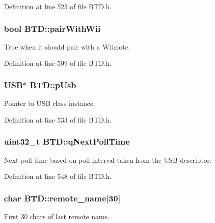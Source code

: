 \-Definition at line 525 of file \-B\-T\-D.\-h.

\hypertarget{class_b_t_d_a0c8cc2a2dd2cda3e760b8b4c1a2d169c}{
\subsubsection[{pair\-With\-Wii}]{\setlength{\rightskip}{0pt plus 5cm}bool {\bf \-B\-T\-D\-::pair\-With\-Wii}}}\label{class_b_t_d_a0c8cc2a2dd2cda3e760b8b4c1a2d169c}
\-True when it should pair with a \-Wiimote. 

\-Definition at line 509 of file \-B\-T\-D.\-h.

\hypertarget{class_b_t_d_a4bcd1d622a6455ee3d0cccc4408700a1}{
\subsubsection[{p\-Usb}]{\setlength{\rightskip}{0pt plus 5cm}\-U\-S\-B$\ast$ {\bf \-B\-T\-D\-::p\-Usb}}}\label{class_b_t_d_a4bcd1d622a6455ee3d0cccc4408700a1}
\-Pointer to \-U\-S\-B class instance. 

\-Definition at line 533 of file \-B\-T\-D.\-h.

\hypertarget{class_b_t_d_a52d6c7895f6bb01729d01ce28a2f3079}{
\subsubsection[{q\-Next\-Poll\-Time}]{\setlength{\rightskip}{0pt plus 5cm}uint32\-\_\-t {\bf \-B\-T\-D\-::q\-Next\-Poll\-Time}}}\label{class_b_t_d_a52d6c7895f6bb01729d01ce28a2f3079}
\-Next poll time based on poll interval taken from the \-U\-S\-B descriptor. 

\-Definition at line 548 of file \-B\-T\-D.\-h.

\hypertarget{class_b_t_d_aa0fd5483f227e29de23c20ee31c940aa}{
\subsubsection[{remote\-\_\-name}]{\setlength{\rightskip}{0pt plus 5cm}char {\bf \-B\-T\-D\-::remote\-\_\-name}\mbox{[}30\mbox{]}}}\label{class_b_t_d_aa0fd5483f227e29de23c20ee31c940aa}
\-First 30 chars of last remote name. 

